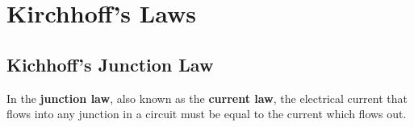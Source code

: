 %    
%
%    
%
%    
%  
%
%
%
%
%  
%
%  
%
%
%
\section{Kirchhoff's Laws}
%
\subsection{Kichhoff's Junction Law}
In the \textbf{junction law}, also known as the \textbf{current law}, the
electrical current that flows into any junction in a circuit must be equal to
the current which flows out.

